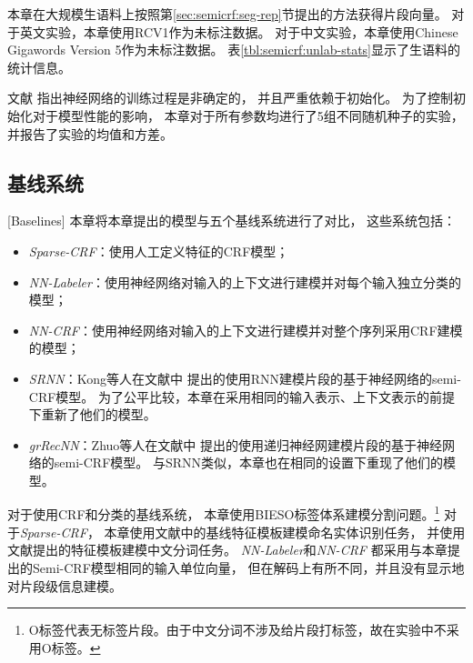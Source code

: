 本章在大规模生语料上按照第\ref{sec:semicrf:seg-rep}节提出的方法获得片段向量。
对于英文实验，本章使用RCV1作为未标注数据。
对于中文实验，本章使用Chinese Gigawords Version 5作为未标注数据。
表\ref{tbl:semicrf:unlab-stats}显示了生语料的统计信息。

文献
指出神经网络的训练过程是非确定的，
并且严重依赖于初始化。
为了控制初始化对于模型性能的影响，
本章对于所有参数均进行了5组不同随机种子的实验，并报告了实验的均值和方差。

\subsection{基线系统}[Baselines]
本章将本章提出的模型与五个基线系统进行了对比，
这些系统包括：
\begin{itemize}
	\item \textit{Sparse-CRF}：使用人工定义特征的CRF模型；
	\item \textit{NN-Labeler}：使用神经网络对输入的上下文进行建模并对每个输入独立分类的模型；
	\item \textit{NN-CRF}：使用神经网络对输入的上下文进行建模并对整个序列采用CRF建模的模型；
	\item \textit{SRNN}：Kong等人在文献中
	提出的使用RNN建模片段的基于神经网络的semi-CRF模型。
	为了公平比较，本章在采用相同的输入表示、上下文表示的前提下重新了他们的模型。
	\item \textit{grRecNN}：Zhuo等人在文献中
	提出的使用递归神经网建模片段的基于神经网络的semi-CRF模型。
	与SRNN类似，本章也在相同的设置下重现了他们的模型。
\end{itemize}

对于使用CRF和分类的基线系统，
本章使用BIESO标签体系建模分割问题。\footnote {O标签代表无标签片段。由于中文分词不涉及给片段打标签，故在实验中不采用O标签。}
对于\textit{Sparse-CRF}，
本章使用文献中的基线特征模板建模命名实体识别任务，
并使用文献提出的特征模板建模中文分词任务。
\textit{NN-Labeler}和\textit{NN-CRF}
都采用与本章提出的Semi-CRF模型相同的输入单位向量，
但在解码上有所不同，并且没有显示地对片段级信息建模。

